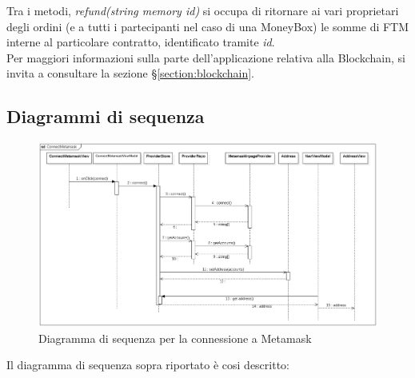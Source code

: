 Tra i metodi, \textit{refund(string memory id)} si occupa di ritornare ai vari proprietari degli ordini 
(e a tutti i partecipanti nel caso di una MoneyBox) le somme di FTM interne al particolare contratto, identificato tramite \textit{id}.
\\
Per maggiori informazioni sulla parte dell'applicazione relativa alla Blockchain, si invita a consultare la sezione §\ref{section:blockchain}.



\subsection{Diagrammi di sequenza}

\begin{figure}[H]
    \centering
    \includegraphics[scale = 0.45]{immagini/diagrammaMeta.png}
    \caption{Diagramma di sequenza per la connessione a Metamask}
\end{figure}

Il diagramma di sequenza sopra riportato è cosi descritto:

